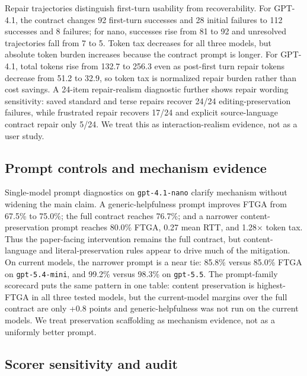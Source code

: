 Repair trajectories distinguish first-turn usability from recoverability. For
GPT-4.1, the contract changes 92 first-turn successes and 28 initial failures to
112 successes and 8 failures; for nano, successes rise from 81 to 92 and
unresolved trajectories fall from 7 to 5. Token tax decreases for all three
models, but absolute token burden increases because the contract prompt is
longer. For GPT-4.1, total tokens rise from 132.7 to 256.3 even as post-first
turn repair tokens decrease from 51.2 to 32.9, so token tax is normalized repair
burden rather than cost savings. A 24-item repair-realism diagnostic further
shows repair wording sensitivity: saved standard and terse repairs recover
24/24 editing-preservation failures, while frustrated repair recovers 17/24 and
explicit source-language contract repair only 5/24. We treat this as
interaction-realism evidence, not as a user study.

\subsection{Prompt controls and mechanism evidence}

Single-model prompt diagnostics on \texttt{gpt-4.1-nano} clarify mechanism
without widening the main claim. A generic-helpfulness prompt improves FTGA from
67.5\% to 75.0\%; the full contract reaches 76.7\%; and a narrower
content-preservation prompt reaches 80.0\% FTGA, 0.27 mean RTT, and
1.28$\times$ token tax. Thus the paper-facing intervention remains the full
contract, but content-language and literal-preservation rules appear to drive
much of the mitigation. On current models, the narrower prompt is a near tie:
85.8\% versus 85.0\% FTGA on \texttt{gpt-5.4-mini}, and 99.2\% versus 98.3\% on
\texttt{gpt-5.5}. The prompt-family scorecard puts the same pattern in one
table: content preservation is highest-FTGA in all three tested models, but the
current-model margins over the full contract are only +0.8 points and
generic-helpfulness was not run on the current models. We treat preservation
scaffolding as mechanism evidence, not as a uniformly better prompt.

\subsection{Scorer sensitivity and audit}

